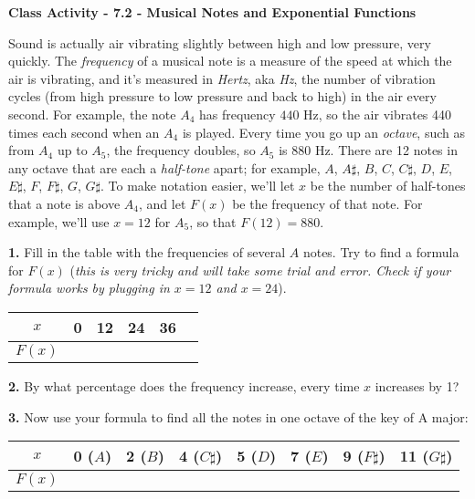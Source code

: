 \documentclass[letterpaper, 12pt]{article}
\begin{document}
\begin{center}   \textbf{Class Activity - 7.2 - Musical Notes and Exponential Functions} 
\end{center} 

Sound is actually air vibrating slightly between high and low pressure, very quickly. The \emph{frequency} of a musical note is a measure of the speed at which the air is vibrating, and it's measured in \emph{Hertz}, aka \emph{Hz}, the number of vibration cycles (from high pressure to low pressure and back to high) in the air every second. For example, the note $A_4$ has frequency $440$ Hz, so the air vibrates 440 times each second when an $A_4$ is played. Every time you go up an \emph{octave}, such as from $A_4$ up to $A_5$, the frequency doubles, so $A_5$ is $880$ Hz. There are 12 notes in any octave that are each a \emph{half-tone} apart; for example, $A$, $A\sharp$, $B$, $C$, $C\sharp$, $D$, $E$, $E\sharp$, $F$, $F\sharp$, $G$, $G\sharp$.  To make notation easier, we'll let $x$ be the number of half-tones that a note is above $A_4$, and let $F(x)$ be the frequency of that note. For example, we'll use $x=12$ for $A_5$, so that $F(12)=880$.

\textbf{1.} Fill in the table with the frequencies of several $A$ notes. Try to find a formula for $F(x)$ (\emph{this is very tricky and will take some trial and error. Check if your formula works by plugging in $x=12$ and $x=24$}).

\begin{tabular}{|c | c | c | c | c | c |} \hline
	$x$ &	0 & 12 & 24 & 36 \\ \hline
	$F(x)$ & \hspace{8ex} &\hspace{8ex}  & \hspace{8ex} & \hspace{8ex} \\ \hline
\end{tabular}

\vspace{3in}
\textbf{2.} By what percentage does the frequency increase, every time $x$ increases by 1?

\vfill
\textbf{3.} Now use your formula to find all the notes in one octave of the key of A major:

\begin{tabular}{|c | c | c | c | c | c |c |c |} \hline
	$x$ &	0 ($A$)  & 2 ($B$) & 4 ($C\sharp$) & 5 ($D$) & 7 ($E$) & 9 ($F\sharp$) & 11 ($G\sharp$)   \\ \hline
	$F(x)$ & \hspace{8ex} &\hspace{8ex}  & \hspace{8ex} & \hspace{8ex} & \hspace{8ex} & \hspace{8ex} & \hspace{8ex} \\ \hline
\end{tabular}
\end{document}
